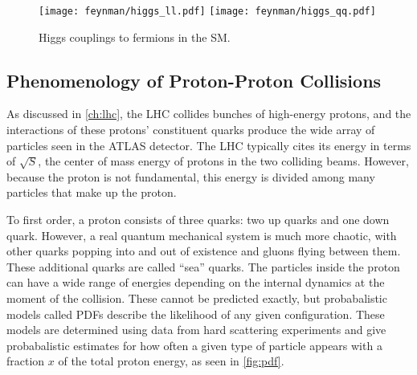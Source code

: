  \begin{centering}
\begin{figure}[!hbt]
\myfloatalign
\texttt{[image: feynman/higgs\_ll.pdf]}
\texttt{[image: feynman/higgs\_qq.pdf]}
\caption{Higgs couplings to fermions in the \ac{SM}.}
\label{fig:higgs_fermion}
\end{figure}
\end{centering}






\subsection{Phenomenology of Proton-Proton Collisions}
\label{sec:pp_collisions}

As discussed in \autoref{ch:lhc}, the \ac{LHC} collides bunches of high-energy protons, and the interactions of these protons' constituent quarks produce the wide array of particles seen in the ATLAS detector. The \ac{LHC} typically cites its energy in terms of $\sqrt{S}$, the center of mass energy of protons in the two colliding beams. However, because the proton is not fundamental, this energy is divided among many particles that make up the proton. 

To first order, a proton consists of three quarks: two up quarks and one down quark. However, a real quantum mechanical system is much more chaotic, with other quarks popping into and out of existence and gluons flying between them. These additional quarks are called ``sea'' quarks. The particles inside the proton can have a wide range of energies depending on the internal dynamics at the moment of the collision. These cannot be predicted exactly, but probabalistic models called \acp{PDF} describe the likelihood of any given configuration. These models are determined using data from hard scattering experiments and give probabalistic estimates for how often a given type of particle appears with a fraction $x$ of the total proton energy, as seen in \autoref{fig:pdf}. 

